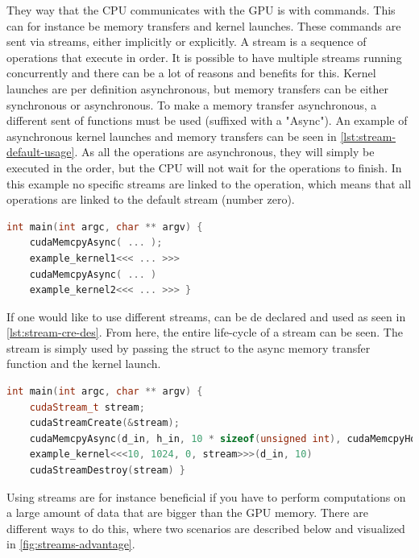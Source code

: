 They way that the CPU communicates with the GPU is with commands.
This can for instance be memory transfers and kernel launches.
These commands are sent via streams, either implicitly or explicitly.
A stream is a sequence of operations that execute in order.
It is possible to have multiple streams running concurrently and there can be a lot of reasons and benefits for this.
Kernel launches are per definition asynchronous, but memory transfers can be either synchronous or asynchronous.
To make a memory transfer asynchronous, a different sent of \cuda{} functions must be used (suffixed with a "Async").
An example of asynchronous kernel launches and memory transfers can be seen in \autoref{lst:stream-default-usage}.
As all the operations are asynchronous, they will simply be executed in the order, but the CPU will not wait for the operations to finish.
In this example no specific streams are linked to the operation, which means that all operations are linked to the default stream (number zero).
\begin{lstlisting}[language=C++,caption={Default stream usage},label=lst:stream-default-usage]
int main(int argc, char ** argv) {
	cudaMemcpyAsync( ... );
	example_kernel1<<< ... >>>
	cudaMemcpyAsync( ... )
	example_kernel2<<< ... >>> }
\end{lstlisting}
If one would like to use different streams, can be de declared and used as seen in \autoref{lst:stream-cre-des}.
From here, the entire life-cycle of a \cuda{} stream can be seen.
The stream is simply used by passing the \cuda{} struct to the async memory transfer function and the kernel launch.
\begin{lstlisting}[language=C++,caption={Stream creation, usage and destruction},label=lst:stream-cre-des]
int main(int argc, char ** argv) {
	cudaStream_t stream;
	cudaStreamCreate(&stream);
	cudaMemcpyAsync(d_in, h_in, 10 * sizeof(unsigned int), cudaMemcpyHostToDevice, stream);
	example_kernel<<<10, 1024, 0, stream>>>(d_in, 10)
	cudaStreamDestroy(stream) }
\end{lstlisting}
Using streams are for instance beneficial if you have to perform computations on a large amount of data that are bigger than the GPU memory.
There are different ways to do this, where two scenarios are described below and visualized in \autoref{fig:streams-advantage}.
